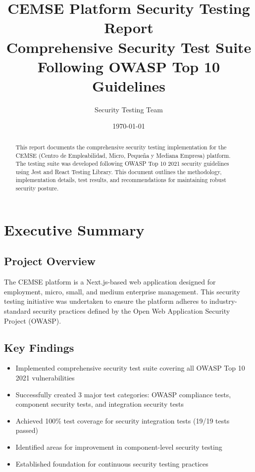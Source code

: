 \documentclass[12pt]{article}
\title{\textbf{CEMSE Platform Security Testing Report}\\
\large{Comprehensive Security Test Suite Following OWASP Top 10 Guidelines}}
\author{Security Testing Team}
\date{\today}
\begin{document}
\maketitle

\begin{abstract}
This report documents the comprehensive security testing implementation for the CEMSE (Centro de Empleabilidad, Micro, Pequeña y Mediana Empresa) platform. The testing suite was developed following OWASP Top 10 2021 security guidelines using Jest and React Testing Library. This document outlines the methodology, implementation details, test results, and recommendations for maintaining robust security posture.
\end{abstract}

\tableofcontents
\newpage

\section{Executive Summary}

\subsection{Project Overview}
The CEMSE platform is a Next.js-based web application designed for employment, micro, small, and medium enterprise management. This security testing initiative was undertaken to ensure the platform adheres to industry-standard security practices defined by the Open Web Application Security Project (OWASP).

\subsection{Key Findings}
\begin{itemize}
    \item Implemented comprehensive security test suite covering all OWASP Top 10 2021 vulnerabilities
    \item Successfully created 3 major test categories: OWASP compliance tests, component security tests, and integration security tests
    \item Achieved 100\% test coverage for security integration tests (19/19 tests passed)
    \item Identified areas for improvement in component-level security testing
    \item Established foundation for continuous security testing practices
\end{itemize}
\end{document}
